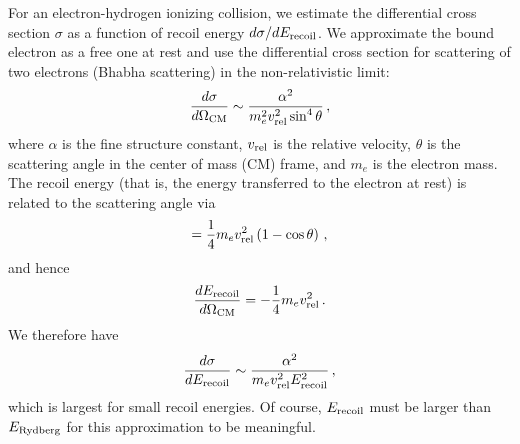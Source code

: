 \documentclass[iop,numberedappendix,apj]{emulateapj}
\begin{document}
For an electron-hydrogen ionizing collision, we estimate the differential cross section $\sigma$ as a function of recoil energy $d\sigma / dE_{\rm recoil}$.
We approximate the bound electron as a free one at rest and use the differential cross section for scattering of two electrons (Bhabha scattering) in the non-relativistic limit:
\begin{equation}
\label{eq:dsig/dOmeg} \frac{d\sigma}{d\Omega_{\rm CM}} \sim \frac{\alpha^2}{m_e^2 v_{\rm rel}^2 \sin^4 \theta} \, ,
\end{equation}
where $\alpha$ is the fine structure constant, $v_{\rm rel}$ is the relative velocity, $\theta$ is the scattering angle in the center of mass (CM) frame, and $m_e$ is the electron mass.
The recoil energy (that is, the energy transferred to the electron at rest) is related to the scattering angle via
\begin{equation}
  \label{eq:Erec} = \frac{1}{4} m_e v_{\rm rel}^2 \left( 1 - \cos \theta \right) \, ,
\end{equation}
and hence
\begin{equation}
  \label{eq:dErec/dOmeg} \frac{dE_{\rm recoil}}{d\Omega_{\rm CM}} = -\frac{1}{4} m_e v_{\rm rel}^2 \, .
\end{equation}
We therefore have
\begin{equation}
  \label{eq:dsig/dErec} \frac{d\sigma}{dE_{\rm recoil}} \sim \frac{\alpha^2}{m_e v_{\rm rel}^2 E_{\rm recoil}^2} \, ,
\end{equation}
which is largest for small recoil energies.
Of course, $E_{\rm recoil}$ must be larger than $E_{\rm Rydberg}$ for this approximation to be meaningful. 
\end{document}
